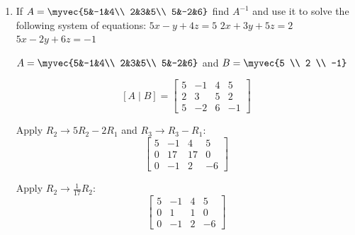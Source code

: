 \begin{enumerate}[label=\thesubsection.\arabic*, ref=\thesubsection.\theenumi]
Evaluating the integrals individually:
$$
I_1 = \frac{5}{2} \left[ \frac{(x-2)^2}{2} \right]_{2}^{4} = \frac{5}{2} \left( \frac{4}{2} - 0 \right) = 5 \\$$
$$I_2 = \left[ 9x - \frac{x^2}{2} \right]_{4}^{6} = \left( 54 - 18 \right) - \left( 36 - 8 \right) = 36 - 28 = 8 \\$$
$$I_3 = \frac{3}{4} \left[ \frac{(x-2)^2}{2} \right]_{2}^{6} = \frac{3}{4} \left( \frac{16}{2} - 0 \right) = 6
$$

Combining the results:
\begin{align*}
\text{Area}(\triangle ABC) &= I_1 + I_2 - I_3 \\
&= 5 + 8 - 6 \\
&= 7 \text{ sq. units}
\end{align*}

area $\implies 7 \text{ sq. units}$

\item

If $A=\myvec{5&-1&4\\ 2&3&5\\ 5&-2&6}$ find $A^{-1}$ and use it to solve the following system of equations:
$5x-y+4z=5$\newline
$2x+3y+5z=2$\newline 
$5x-2y+6z=-1$

\solution 
$A= \myvec{5&-1&4\\ 2&3&5\\ 5&-2&6}$ and $B= \myvec{5 \\ 2 \\ -1}$



$$
[A \mid B] = \left[ \begin{array}{ccc|c}
	5 & -1 & 4 & 5 \\
	2 & 3 & 5 & 2 \\
	5 & -2 & 6 & -1
\end{array} \right]
$$

Apply $R_2 \rightarrow 5R_2 - 2R_1$ and $R_3 \rightarrow R_3 - R_1$:
$$ \left[ \begin{array}{ccc|c}
	5 & -1 & 4 & 5 \\
	0 & 17 & 17 & 0 \\
	0 & -1 & 2 & -6
\end{array} \right]
$$

Apply $R_2 \rightarrow \frac{1}{17}R_2$:
$$
\left[ \begin{array}{ccc|c}
	5 & -1 & 4 & 5 \\
	0 & 1 & 1 & 0 \\
	0 & -1 & 2 & -6
\end{array} \right]
$$



\end{enumerate}
